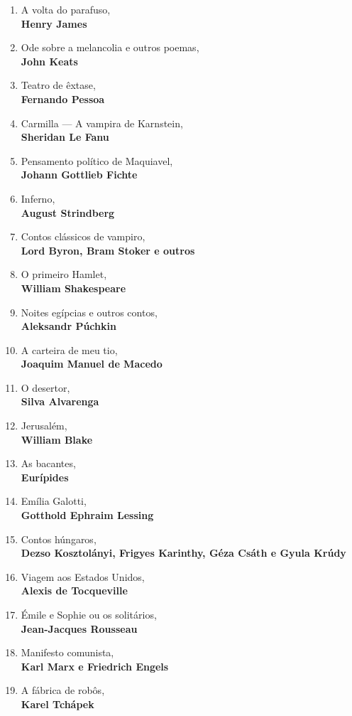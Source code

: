 \begin{enumerate} [font=\Formular\footnotesize]
\item A volta do parafuso,\\ \textbf{Henry James}
\item Ode sobre a melancolia e outros poemas,\\ \textbf{John Keats} 
\item Teatro de êxtase,\\ \textbf{Fernando Pessoa}
\item Carmilla --- A vampira de Karnstein,\\ \textbf{Sheridan Le Fanu}
\item Pensamento político de Maquiavel,\\ \textbf{Johann Gottlieb Fichte}
\item Inferno,\\ \textbf{August Strindberg}
\item Contos clássicos de vampiro,\\ \textbf{Lord Byron, Bram Stoker e outros}
\item O primeiro Hamlet,\\ \textbf{William Shakespeare}
\item Noites egípcias e outros contos,\\ \textbf{Aleksandr Púchkin}
\item A carteira de meu tio,\\ \textbf{Joaquim Manuel de Macedo}
\item O desertor,\\ \textbf{Silva Alvarenga}
\item Jerusalém,\\ \textbf{William Blake}
\item As bacantes,\\ \textbf{Eurípides}
\item Emília Galotti,\\ \textbf{Gotthold Ephraim Lessing}
\item Contos húngaros,\\ \textbf{Dezso Kosztolányi, Frigyes Karinthy, Géza Csáth e Gyula Krúdy}
\item Viagem aos Estados Unidos,\\ \textbf{Alexis de Tocqueville}
\item Émile e Sophie ou os solitários,\\ \textbf{Jean-Jacques Rousseau}
\item Manifesto comunista,\\ \textbf{Karl Marx e Friedrich Engels}
\item A fábrica de robôs,\\ \textbf{Karel Tchápek}

\end{enumerate}
